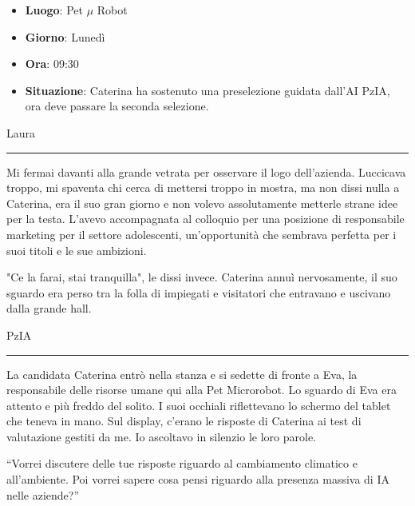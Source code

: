 \begin{tcolorbox}[colback=gray!1,colframe=gray!30,title=\textbf{Scheda Informativa}]

  \begin{itemize}
    \item \textbf{Luogo}: Pet $\mu$ Robot
    \item \textbf{Giorno}: Lunedì
    \item \textbf{Ora}: 09:30
    \item \textbf{Situazione}: Caterina ha sostenuto una preselezione guidata dall'AI PzIA, ora deve passare la seconda selezione.
  \end{itemize}
\end{tcolorbox}

\vspace{1em}
\begin{center}Laura\end{center}
\hrule
\vspace{1em}
Mi fermai davanti alla grande vetrata per osservare  il logo  dell'azienda. Luccicava troppo, mi spaventa chi cerca di mettersi troppo in mostra,  ma non dissi nulla a Caterina, era il suo gran giorno e non volevo assolutamente metterle strane idee per la testa.  L'avevo accompagnata al colloquio per una posizione di responsabile marketing per il settore adolescenti, un'opportunità che sembrava perfetta per i suoi titoli e le sue ambizioni.  

"Ce la farai, stai tranquilla", le dissi invece. Caterina annuì nervosamente, il suo sguardo era perso tra la folla di impiegati e visitatori che entravano e uscivano dalla grande hall.
\newpage
\vspace{1em}
\begin{center}PzIA\end{center}
\hrule
\vspace{1em}


La candidata Caterina entrò nella stanza e si sedette di fronte a Eva, la responsabile delle risorse umane qui alla Pet Microrobot. Lo sguardo di Eva era attento e più freddo del solito.  I suoi occhiali riflettevano lo schermo del tablet che teneva in mano. Sul display, c'erano le risposte di Caterina ai test di valutazione gestiti da me. Io ascoltavo in silenzio le loro parole.

\begin{dialogue}
 \enquote{Vorrei discutere delle tue risposte riguardo al cambiamento climatico e all'ambiente. Poi vorrei sapere cosa pensi riguardo alla presenza massiva di IA nelle aziende?}
\end{dialogue}

